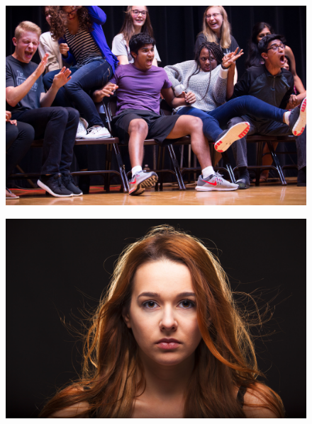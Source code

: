 \documentclass{report}
\begin{document}
\begin{landscape}
  \begin{figure}
    \centering
    \includegraphics[height=\textheight]{res/event_hypnotist.jpg}
  \end{figure}
\end{landscape}

\begin{landscape}
  \begin{figure}
    \centering
    \includegraphics[width=\linewidth]{res/port_karolina.jpg}
  \end{figure}
\end{landscape}
\end{document}
